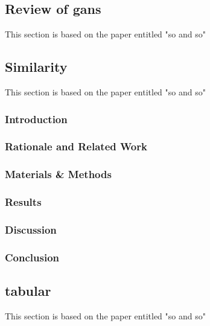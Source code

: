 \subsection{Review of gans}\label{subsec:gans}
This section is based on the paper entitled "so and so"



\subsection{Similarity}\label{subsec:similarity}
This section is based on the paper entitled "so and so"

\subsubsection{Introduction}

\subsubsection{Rationale and Related Work}

\subsubsection{Materials \& Methods}


\subsubsection{Results}

\subsubsection{Discussion}

\subsubsection{Conclusion}




\subsection{tabular}\label{subsec:tabular}
This section is based on the paper entitled "so and so"






